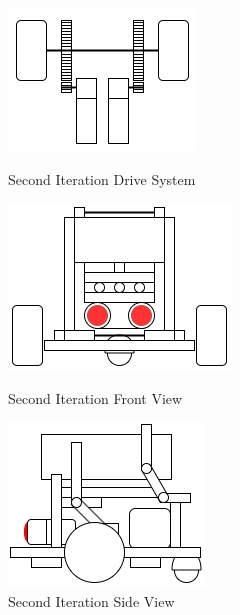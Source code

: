 \documentclass[11pt]{article}
\begin{document}
\begin{figure}[htp]
\centering
\captionsetup{justification=centering}
\includegraphics[scale=0.80]{images/Hardware_Mechanical/Third_Iteration_Design_drive.png}
\caption{Second Iteration Drive System}\label{fig:Drive System}
\endminipage\hfill
{}
\includegraphics[scale=0.70]{images/Hardware_Mechanical/Third_Iteration_Design_front.png}
\caption{Second Iteration Front View}\label{fig:Front View}
\endminipage\hfill
{}
\includegraphics[scale=0.70]{images/Hardware_Mechanical/Third_Iteration_Design_side.png}
\caption{Second Iteration Side View}\label{Side View}
\endminipage
\end{figure}
\end{document}
